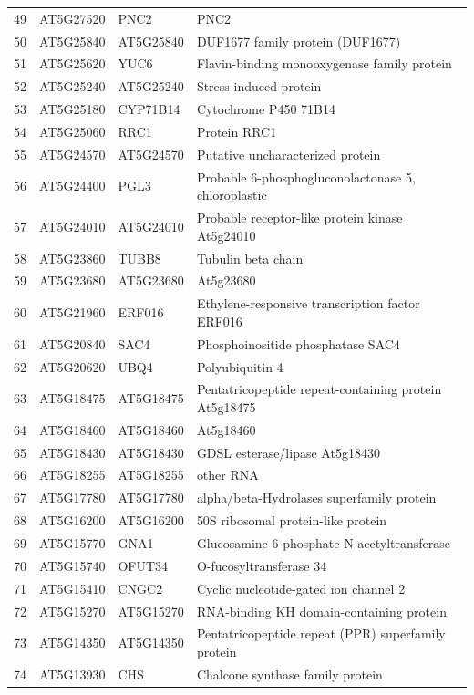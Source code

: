 \documentclass[11pt]{article}
\begin{document}
\begin{center}
\begin{tabular}{rlll}
49 & AT5G27520 & PNC2 & PNC2\\
50 & AT5G25840 & AT5G25840 & DUF1677 family protein (DUF1677)\\
51 & AT5G25620 & YUC6 & Flavin-binding monooxygenase family protein\\
52 & AT5G25240 & AT5G25240 & Stress induced protein\\
53 & AT5G25180 & CYP71B14 & Cytochrome P450 71B14\\
54 & AT5G25060 & RRC1 & Protein RRC1\\
55 & AT5G24570 & AT5G24570 & Putative uncharacterized protein\\
56 & AT5G24400 & PGL3 & Probable 6-phosphogluconolactonase 5, chloroplastic\\
57 & AT5G24010 & AT5G24010 & Probable receptor-like protein kinase At5g24010\\
58 & AT5G23860 & TUBB8 & Tubulin beta chain\\
59 & AT5G23680 & AT5G23680 & At5g23680\\
60 & AT5G21960 & ERF016 & Ethylene-responsive transcription factor ERF016\\
61 & AT5G20840 & SAC4 & Phosphoinositide phosphatase SAC4\\
62 & AT5G20620 & UBQ4 & Polyubiquitin 4\\
63 & AT5G18475 & AT5G18475 & Pentatricopeptide repeat-containing protein At5g18475\\
64 & AT5G18460 & AT5G18460 & At5g18460\\
65 & AT5G18430 & AT5G18430 & GDSL esterase/lipase At5g18430\\
66 & AT5G18255 & AT5G18255 & other RNA\\
67 & AT5G17780 & AT5G17780 & alpha/beta-Hydrolases superfamily protein\\
68 & AT5G16200 & AT5G16200 & 50S ribosomal protein-like protein\\
69 & AT5G15770 & GNA1 & Glucosamine 6-phosphate N-acetyltransferase\\
70 & AT5G15740 & OFUT34 & O-fucosyltransferase 34\\
71 & AT5G15410 & CNGC2 & Cyclic nucleotide-gated ion channel 2\\
72 & AT5G15270 & AT5G15270 & RNA-binding KH domain-containing protein\\
73 & AT5G14350 & AT5G14350 & Pentatricopeptide repeat (PPR) superfamily protein\\
74 & AT5G13930 & CHS & Chalcone synthase family protein\\

\end{tabular}
\end{center}
\end{document}
